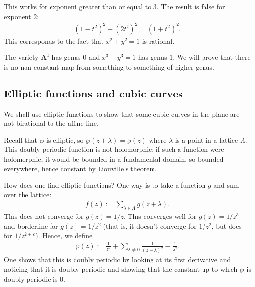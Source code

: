 \documentclass [11 pt, oneside] {article}
\begin{document}
\begin{remark}
	This works for exponent greater than or equal to $3$. The result is false for exponent $2$:
	\begin{align*}
		(1-t^2)^2 +  (2t^2)^2 =  (1+t^2)^2.
	\end{align*}
	This corresponds to the fact that $x^2+y^2=1$ is rational.
\end{remark}

\begin{remark}
	The variety $\mathbf{A}^1$ has genus $0$ and $x^3+y^3=1$ has genus $1$. We will prove that there is no non-constant map from something to something of higher genus.
\end{remark}

\subsection{Elliptic functions and cubic curves}
We shall use elliptic functions to show that some cubic curves in the plane are not birational to the affine line.

Recall that $\wp$ is elliptic, so $\wp(z+\lambda) = \wp(z)$ where $\lambda$ is a point in a lattice $\Lambda$. This doubly periodic function is not holomorphic; if such a function were holomorphic, it would be bounded in a fundamental domain, so bounded everywhere, hence constant by Liouville's theorem. 

How does one find elliptic functions? One way is to take a function $g$ and sum over the lattice:
\begin{align*}
	f(z) :=  \sum_{\lambda\in \Lambda}^{} g (z+\lambda).
\end{align*}
This does not converge for $g(z) = 1/z$. This converges well for $g(z) = 1/z^3$ and borderline for $g(z)=1/z^2$ (that is, it doesn't converge for $1/z^2$, but does for $1/z^{2+\varepsilon}$). Hence, we define
 \begin{align*}
	\wp(z) :=  \frac{1}{z^2} + \sum_{\lambda\ne 0}^{} \frac{1}{(z-\lambda)^2} - \frac{1}{\lambda^2}.
\end{align*}
One shows that this is doubly periodic by looking at its first derivative and noticing that it is doubly periodic and showing that the constant up to which $\wp$ is doubly periodic is $0$.
\end{document}

